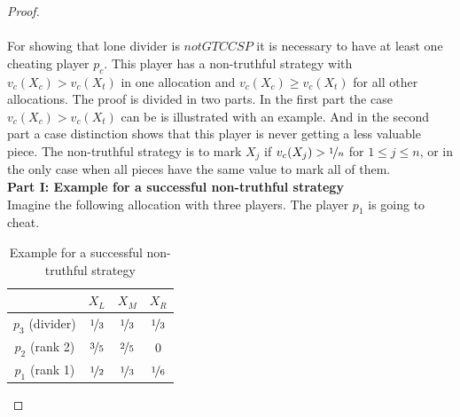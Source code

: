 \begin{proof}
\textcolor{white}{x}\\\\
For showing that lone divider is $notGTCCSP$ it is necessary to have at least one cheating player $p_c$. This player has a non-truthful strategy with $v_c(X_c)>v_c(X_t)$ in one allocation and $v_c(X_c) \geq v_c(X_t)$ for all other allocations. The proof is divided in two parts. In the first part the case $v_c(X_c)>v_c(X_t)$ can be is illustrated with an example. And in the second part a case distinction shows that this player is never getting a less valuable piece.
The non-truthful strategy is to mark $X_j$ if $v_c(X_j) > \nicefrac{1}{n}$ for $1 \leq j \leq n$, or in the only case when all pieces have the same value to mark all of them.\\
\newline
\textbf{Part I: Example for a successful non-truthful strategy}\\
\newline
Imagine the following allocation with three players. The player $p_1$ is going to cheat.
		\begin{table}[htb]
		\centering
		\renewcommand{\arraystretch}{1.2}
		\begin{tabular}{c|ccc}
		& $X_L$& $X_M$& $X_R$\\
		\hline
		$p_3$ (divider)  & $\nicefrac{1}{3}$ & {$\nicefrac{1}{3}$} & $\nicefrac{1}{3}$ \\
  $p_2$ (rank 2) & {$\nicefrac{3}{5}$} & $\nicefrac{2}{5}$ & $0$\\
  $p_1$ (rank 1)& {$\nicefrac{1}{2}$} & $\nicefrac{1}{3}$ & $\nicefrac{1}{6}$
 		\end{tabular}
 		
\caption{Example for a successful non-truthful strategy}\label{Table10}
\end{table}


\end{proof}
